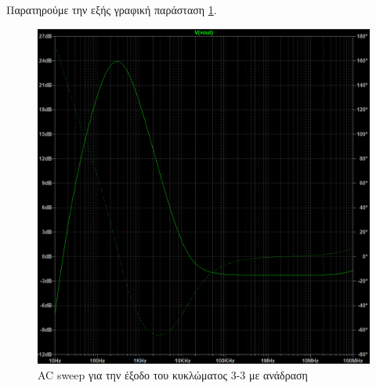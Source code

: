 \documentclass[11pt,a4paper,twoside,onecolumn,openright,final]{memoir}
\begin{document}
Παρατηρούμε την εξής γραφική παράσταση \ref{fig:ex3plot6}.
\begin{figure}[H]
\centerfloat
\includegraphics[width=12.0cm]{figures/exercise3_3plot_feedback.png}
\caption{AC sweep για την έξοδο του κυκλώματος 3-3 με ανάδραση}
\label{fig:ex3plot6}
\end{figure}
\end{document}
